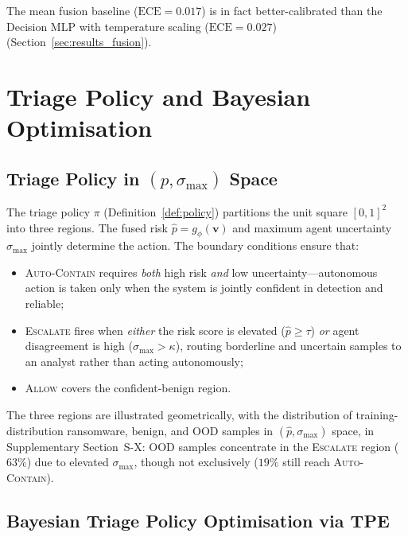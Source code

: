 \documentclass[journal]{IEEEtran}
\begin{document}
The mean fusion baseline ($\text{ECE}=0.017$) is in fact better-calibrated
than the Decision MLP with temperature scaling ($\text{ECE}=0.027$)
(Section~\ref{sec:results_fusion}).

\section{Triage Policy and Bayesian Optimisation}\label{sec:triage}

\subsection{Triage Policy in $(\hat{p}, \sigma_{\max})$ Space}

The triage policy $\pi$ (Definition~\ref{def:policy}) partitions the unit
square $[0,1]^2$ into three regions. The fused risk $\hat{p} =
g_\phi(\mathbf{v})$ and maximum agent uncertainty $\sigma_{\max}$ jointly
determine the action. The boundary conditions ensure that:
\begin{itemize}
  \item \textsc{Auto-Contain} requires \emph{both} high risk \emph{and} low
        uncertainty---autonomous action is taken only when the system is
        jointly confident in detection and reliable;
  \item \textsc{Escalate} fires when \emph{either} the risk score is elevated
        ($\hat{p} \geq \tau$) \emph{or} agent disagreement is high
        ($\sigma_{\max} > \kappa$), routing borderline and uncertain samples to
        an analyst rather than acting autonomously;
  \item \textsc{Allow} covers the confident-benign region.
\end{itemize}

The three regions are illustrated geometrically, with the distribution of
training-distribution ransomware, benign, and OOD samples in
$(\hat{p}, \sigma_{\max})$ space, in Supplementary Section~S-X: OOD
samples concentrate in the \textsc{Escalate} region ($63\%$) due to
elevated $\sigma_{\max}$, though not exclusively ($19\%$ still reach
\textsc{Auto-Contain}).

\subsection{Bayesian Triage Policy Optimisation via TPE}
\end{document}
